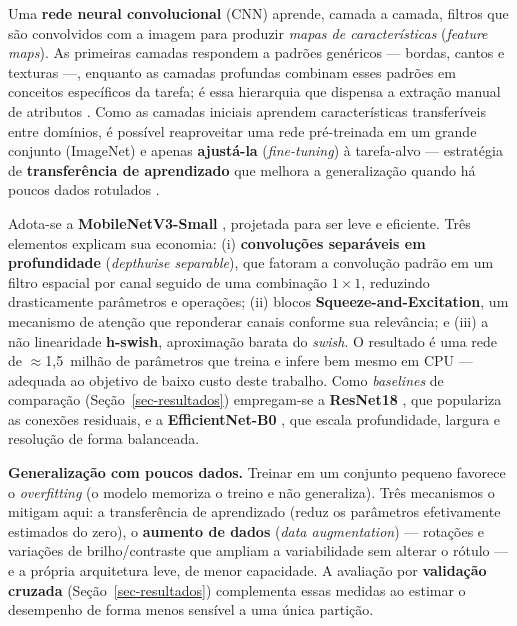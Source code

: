 \documentclass[
	article,			%
	11pt,				%
	oneside,			%
	a4paper,			%
	english,			%
	brazilian,			%
	sumario=tradicional
	]{abntex2}
\begin{document}
Uma \textbf{rede neural convolucional} (CNN) aprende, camada a camada, filtros que
são convolvidos com a imagem para produzir \textit{mapas de características}
(\textit{feature maps}). As primeiras camadas respondem a padrões genéricos ---
bordas, cantos e texturas ---, enquanto as camadas profundas combinam esses padrões
em conceitos específicos da tarefa; é essa hierarquia que dispensa a extração manual
de atributos \cite{gonzalez2018,szeliski2022}. Como as camadas iniciais aprendem
características transferíveis entre domínios, é possível reaproveitar uma rede
pré-treinada em um grande conjunto (ImageNet) e apenas \textbf{ajustá-la}
(\textit{fine-tuning}) à tarefa-alvo --- estratégia de \textbf{transferência de
aprendizado} que melhora a generalização quando há poucos dados rotulados
\cite{yosinski2014transferable}.

Adota-se a \textbf{MobileNetV3-Small} \cite{howard2019mobilenetv3}, projetada para
ser leve e eficiente. Três elementos explicam sua economia: (i) \textbf{convoluções
separáveis em profundidade} (\textit{depthwise separable}), que fatoram a convolução
padrão em um filtro espacial por canal seguido de uma combinação $1\times1$,
reduzindo drasticamente parâmetros e operações; (ii) blocos \textbf{Squeeze-and-Excitation},
um mecanismo de atenção que reponderar canais conforme sua relevância; e (iii) a
não linearidade \textbf{h-swish}, aproximação barata do \textit{swish}. O resultado é
uma rede de $\approx$1,5~milhão de parâmetros que treina e infere bem mesmo em CPU
--- adequada ao objetivo de baixo custo deste trabalho. Como \textit{baselines} de
comparação (Seção~\ref{sec-resultados}) empregam-se a \textbf{ResNet18}
\cite{he2016resnet}, que populariza as conexões residuais, e a \textbf{EfficientNet-B0}
\cite{tan2019efficientnet}, que escala profundidade, largura e resolução de forma
balanceada.

\noindent\textbf{Generalização com poucos dados.} Treinar em um conjunto pequeno
favorece o \textit{overfitting} (o modelo memoriza o treino e não generaliza). Três
mecanismos o mitigam aqui: a transferência de aprendizado (reduz os parâmetros
efetivamente estimados do zero), o \textbf{aumento de dados} (\textit{data
augmentation}) --- rotações e variações de brilho/contraste que ampliam a
variabilidade sem alterar o rótulo \cite{shorten2019augmentation} --- e a própria
arquitetura leve, de menor capacidade. A avaliação por \textbf{validação cruzada}
(Seção~\ref{sec-resultados}) complementa essas medidas ao estimar o desempenho de
forma menos sensível a uma única partição.
\end{document}
